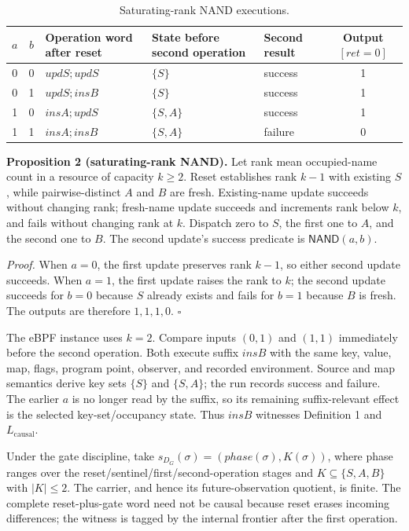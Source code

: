 \documentclass[conference]{IEEEtran}
\begin{document}
\begin{table}[t]
\caption{Saturating-rank NAND executions.}
\label{tab:nand}
\centering
\scriptsize
\begin{tabular}{@{}ccp{}p{}p{}c@{}}
\toprule
$a$ & $b$ & Operation word after reset & State before second operation & Second result & Output $[\mathit{ret}=0]$ \\
\midrule
0 & 0 & $\mathit{updS};\mathit{updS}$ & $\{S\}$ & success & 1 \\
0 & 1 & $\mathit{updS};\mathit{insB}$ & $\{S\}$ & success & 1 \\
1 & 0 & $\mathit{insA};\mathit{updS}$ & $\{S,A\}$ & success & 1 \\
1 & 1 & $\mathit{insA};\mathit{insB}$ & $\{S,A\}$ & failure & 0 \\
\bottomrule
\end{tabular}
\end{table}

\medskip
\noindent\textbf{Proposition 2 (saturating-rank NAND).}
Let rank mean occupied-name count in a resource of capacity $k\ge2$. Reset establishes rank $k-1$ with existing $S$, while pairwise-distinct $A$ and $B$ are fresh. Existing-name update succeeds without changing rank; fresh-name update succeeds and increments rank below $k$, and fails without changing rank at $k$. Dispatch zero to $S$, the first one to $A$, and the second one to $B$. The second update's success predicate is $\mathsf{NAND}(a,b)$.

\emph{Proof.} When $a=0$, the first update preserves rank $k-1$, so either second update succeeds. When $a=1$, the first update raises the rank to $k$; the second update succeeds for $b=0$ because $S$ already exists and fails for $b=1$ because $B$ is fresh. The outputs are therefore $1,1,1,0$. \hfill$\square$

The eBPF instance uses $k=2$. Compare inputs $(0,1)$ and $(1,1)$ immediately before the second operation. Both execute suffix $\mathit{insB}$ with the same key, value, map, flags, program point, observer, and recorded environment. Source and map semantics derive key sets $\{S\}$ and $\{S,A\}$; the run records success and failure. The earlier $a$ is no longer read by the suffix, so its remaining suffix-relevant effect is the selected key-set/occupancy state. Thus $\mathit{insB}$ witnesses Definition 1 and $L_{\mathrm{causal}}$.

Under the gate discipline, take $s_{D_G}(\sigma)=(\mathit{phase}(\sigma),K(\sigma))$, where phase ranges over the reset/sentinel/first/second-operation stages and $K\subseteq\{S,A,B\}$ with $|K|\le2$. The carrier, and hence its future-observation quotient, is finite. The complete reset-plus-gate word need not be causal because reset erases incoming differences; the witness is tagged by the internal frontier after the first operation.
\end{document}
